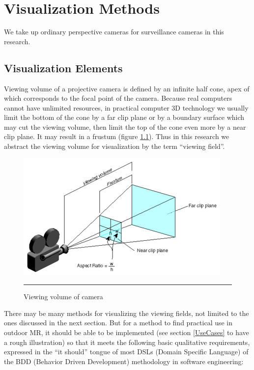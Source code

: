 \chapter{Visualization Methods}
\label{Chapter2}

We take up ordinary perspective cameras for surveillance cameras in this research.


\section{Visualization Elements}
\label{VisualizationRequirements}

Viewing volume of a projective camera is defined by an infinite half cone, apex of which corresponds to the focal point of the camera. Because real computers cannot have unlimited resources, in practical computer 3D technology we usually limit the bottom of the cone by a far clip plane or by a boundary surface which may cut the viewing volume, then limit the top of the cone even more by a near clip plane. It may result in a frustum (figure \ref{fig:ViewingVolume}). Thus in this research we abstract the viewing volume for visualization by the term ``viewing field''.

\begin{figure}[htbp]
	\centering
	\includegraphics{./Primitives/viewing_volume.png}
	\rule{35em}{0.5pt}
	\caption[Viewing volume of camera]{Viewing volume of camera}
	\label{fig:ViewingVolume}
\end{figure}

There may be many methods for visualizing the viewing fields, not limited to the ones discussed in the next section. But for a method to find practical use in outdoor MR, it should be able to be implemented (see section \ref{UseCases} to have a rough illustration) so that it meets the following basic qualitative requirements, expressed in the ``it should'' tongue of most DSLs (Domain Specific Language) of the BDD (Behavior Driven Development) methodology in software engineering:

